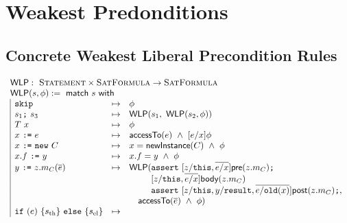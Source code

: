 \section{Weakest Predonditions}

\subsection{Concrete Weakest Liberal Precondition Rules}

\newcommand{\WLP}{\tsf{WLP}}
\newcommand{\weakest}{\max\limits_{\implies}}

\begin{spacing}{1.5}
\begin{align*}
\begin{array}{l}
\WLP : \ \tsc{Statement} \times \tsc{SatFormula} \rightarrow \tsc{SatFormula} \\
\WLP(s, \phi) := \ \tsf{match} \ s \ \tsf{with} \\
\begin{array}{|lcl}
%
\code{skip} &\mapsto&
  \phi
\\
s_1 \code{;} \ s_3 &\mapsto&
  \WLP(s_1, \ \WLP(s_2, \phi))
\\
T \ x &\mapsto&
  \phi
\\
x \ \code{:=} \ e &\mapsto&
  \tsf{accessTo}(e) \ \land \  [e/x] \phi
\\
x \ \code{:=} \ \code{new} \ C &\mapsto&
  x = \tsf{newInstance}(C) \ \land \  \phi
\\
x.f \ \code{:=} \ y &\mapsto&
  x.f = y \ \land \  \phi
\\
y \ \code{:=} \ z.m_C(\overline{e}) &\mapsto&
  \WLP(
    \code{assert} \ [ z/\code{this}, \overline{e/x} ] \tsf{pre}(z.m_C) \code{;} \\ && \hspace{2.5em}
    \text{[} z/\code{this}, \overline{e/x} \text{]} \tsf{body}(z.m_C) \\ && \hspace{2.5em}
    \code{assert} \ [ z/\code{this}, y/\code{result}, \overline{e/\code{old}(x)} ] \tsf{post}(z.m_C) \code{;}, \\ && \hspace{1em}
  \tsf{accessTo}(\overline{e}) \ \land \ \phi)
\\
\code{if} \ (e) \ \{ s_\text{th} \} \ \code{else} \ \{ s_\text{el} \} &\mapsto&

\end{array}
\end{array}
\end{align*}
\end{spacing}
